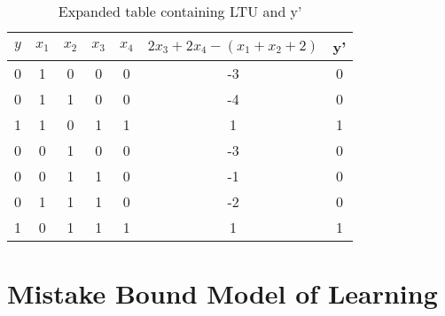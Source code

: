 \documentclass[12pt, fullpage,letterpaper]{article}
\begin{document}
\begin{enumerate}
\begin{table}[h]
	\centering
	\begin{tabular}{|c|cccc|c|c|}
		\hline
		$y$  & $x_1$ & $x_2$  & $x_3$  & $x_4$ &$2x_3 +2x_4 - (x_1 +x_2+2)$ & y' \\
		\hline
		0  &  1    &  0     &  0     &  0  & -3  & 0    \\
		0  &  1    &  1     &  0     &  0   & -4  & 0     \\
		1  &  1    &  0     &  1     &  1   &  1  &  1    \\
		0  &  0    &  1     &  0     &  0   & -3  & 0     \\
		0  &  0    &  1     &  1     &  0   & -1  & 0     \\
		0  &  1    &  1     &  1     &  0   &  -2  & 0    \\
		1  &  0    &  1     &  1     &  1   & 1  & 1    \\
		\hline
	\end{tabular}
	\caption{Expanded table containing LTU and y'}
	\label{t3}
\end{table}

\end{enumerate}


\section{ Mistake Bound Model of Learning}
\end{document}
